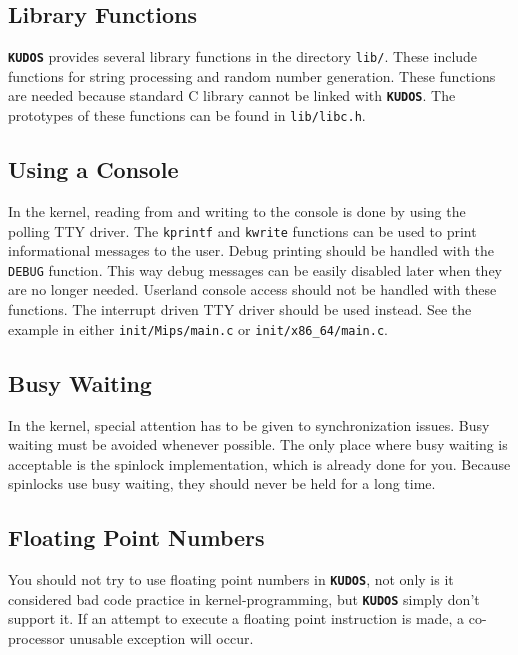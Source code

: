 \documentclass[twoside,a4paper]{report}
\newcommand{\kudos}{\texttt{\textbf{KUDOS}}}
\begin{document}
\subsection{Library Functions}

\kudos{} provides several library functions in the directory
\texttt{lib/}. These include functions for string processing and
random number generation. These functions are needed because standard
C library cannot be linked with \kudos{}. The prototypes of these
functions can be found in \texttt{lib/libc.h}.

\subsection{Using a Console}


In the kernel, reading from and writing to the console is done by
using the polling TTY driver. The \texttt{kprintf} and \texttt{kwrite}
functions can be used to print informational messages to the user.
Debug printing should be handled with the \texttt{DEBUG} function.
This way debug messages can be easily disabled later when
they are no longer needed. Userland console access should not be
handled with these functions. The interrupt driven TTY driver should
be used instead. See the example in either \texttt{init/Mips/main.c} or
\texttt{init/x86\_64/main.c}.

\subsection{Busy Waiting}


In the kernel, special attention has to be given to synchronization
issues.  Busy waiting must be avoided whenever possible. The only
place where busy waiting is acceptable is the spinlock
implementation, which is already done for you. Because spinlocks use
busy waiting, they should never be held for a long time.

\subsection{Floating Point Numbers}


You should not try to use floating point numbers in \kudos{}, not 
only is it considered bad code practice in kernel-programming, 
but \kudos{} simply don't support it. If an attempt to execute a floating point
instruction is made, a co-processor unusable exception will occur.
\end{document}
